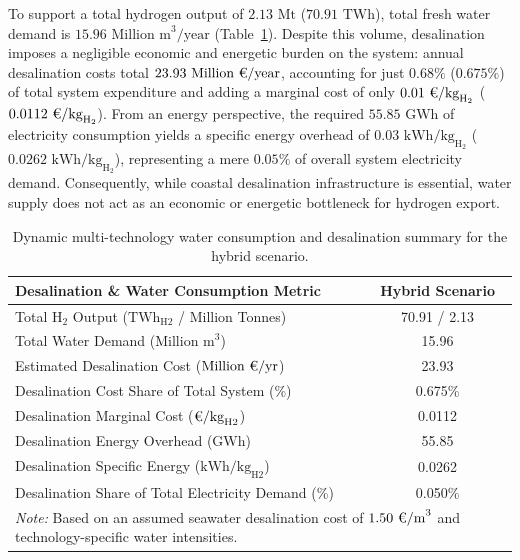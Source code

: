 \documentclass[preprint,12pt]{elsarticle}
\begin{document}
To support a total hydrogen output of $2.13\text{~Mt}$ ($70.91\text{~TWh}$), total fresh water demand is $15.96\text{~Million~m}^3/\text{year}$ (Table~\ref{tab:water_demand_hybrid}). Despite this volume, desalination imposes a negligible economic and energetic burden on the system: annual desalination costs total $23.93\text{~Million~\texteuro/year}$, accounting for just $0.68\%$ ($0.675\%$) of total system expenditure and adding a marginal cost of only $0.01\text{~\texteuro/kg}_{\text{H}_2}$ ($0.0112\text{~\texteuro/kg}_{\text{H}_2}$). From an energy perspective, the required $55.85\text{~GWh}$ of electricity consumption yields a specific energy overhead of $0.03\text{~kWh/kg}_{\text{H}_2}$ ($0.0262\text{~kWh/kg}_{\text{H}_2}$), representing a mere $0.05\%$ of overall system electricity demand. Consequently, while coastal desalination infrastructure is essential, water supply does not act as an economic or energetic bottleneck for hydrogen export.

\begin{table}[htbp]
\centering
\caption{Dynamic multi-technology water consumption and desalination summary for the hybrid scenario.}
\label{tab:water_demand_hybrid}
\begin{tabular}{lc}
\toprule
Desalination \& Water Consumption Metric & Hybrid Scenario \\
\midrule
Total $\text{H}_2$ Output ($\text{TWh}_{\text{H2}}$ / Million Tonnes) & 70.91 / 2.13 \\
Total Water Demand ($\text{Million~m}^3$) & 15.96 \\
Estimated Desalination Cost ($\text{Million~\texteuro/yr}$) & 23.93 \\
Desalination Cost Share of Total System (\%) & 0.675\% \\
Desalination Marginal Cost ($\text{\texteuro/kg}_{\text{H2}}$) & 0.0112 \\
Desalination Energy Overhead ($\text{GWh}$) & 55.85 \\
Desalination Specific Energy ($\text{kWh/kg}_{\text{H2}}$) & 0.0262 \\
Desalination Share of Total Electricity Demand (\%) & 0.050\% \\
\bottomrule
\multicolumn{2}{p{0.68\textwidth}}{\footnotesize \textit{Note:} Based on an assumed seawater desalination cost of $1.50\text{~\texteuro/m}^3$ and technology-specific water intensities.}
\end{tabular}
\end{table}

\end{document}
